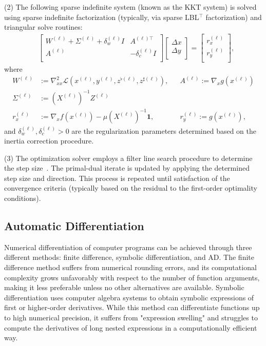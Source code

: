 \documentclass{IEEEtran4PSCC} %
\begin{document}
(2) The following sparse indefinite system (known as the KKT system) is
solved using sparse indefinite factorization (typically, via sparse
LBL$^\top$ factorization) and triangular solve routines:
\begin{align}\label{eqn:kkt-indefinite}
  &\begin{bmatrix}
    W^{(\ell)}  + \Sigma^{(\ell)} + \delta^{(\ell)}_w I& A^{(\ell)\top}\\
    A^{(\ell)} & -\delta_c^{(\ell)} I\\
  \end{bmatrix}
  \begin{bmatrix}
    \Delta x\\
    \Delta y\\
  \end{bmatrix}=
  \begin{bmatrix}
    r_x^{(\ell)}\\
    r_y^{(\ell)}\\
  \end{bmatrix},
\end{align}
where
\begin{align*}
  W^{(\ell)}
  &:=\nabla^{2}_{xx}\mathcal{L}(x^{(\ell)},y^{(\ell)},z^{\flat(\ell)},z^{\sharp(\ell)}),
  &&A^{(\ell)}:= \nabla_xg(x^{(\ell)})\\
  \Sigma^{(\ell)}&:= (X^{(\ell)})^{-1}Z^{(\ell)}\\
  r_x^{(\ell)}
  &:=\nabla_x f(x^{(\ell)}) - \mu (X^{(\ell)})^{-1} \boldsymbol{1},
  &&r_y^{(\ell)}:=g(x^{(\ell)}),
\end{align*}
and $\delta^{(\ell)}_w, \delta^{(\ell)}_c>0$ are the regularization parameters
determined based on the inertia correction procedure.

(3) The optimization solver employs a filter line search procedure to
determine the step size~\cite{wachter2006implementation}. The primal-dual iterate is updated by
applying the determined step size and direction. This process is
repeated until  satisfaction of the convergence criteria (typically based on the residual
to the first-order optimality conditions).

\subsection{Automatic Differentiation}
Numerical differentiation of computer programs can be achieved through
three different methods:  finite difference,  symbolic
differentiation, and  AD. The finite difference method suffers
from numerical rounding errors, and its computational complexity grows
unfavorably with respect to the number of function arguments, making
it less preferable unless no other alternatives are
available. Symbolic differentiation uses computer algebra systems to
obtain symbolic expressions of first or higher-order
derivatives. While this method can differentiate functions up to high
numerical precision, it suffers from "expression swelling"  and
struggles to compute the derivatives of long nested expressions in a
computationally efficient way.
\end{document}
